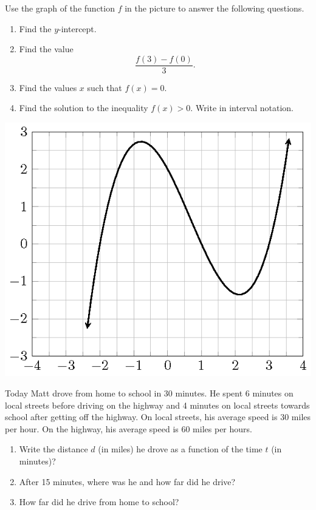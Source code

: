 \documentclass[en,12pt]{elegantbook}
\providecommand{\tightlist}{%
  \setlength{\itemsep}{0pt}\setlength{\parskip}{0pt}}
\providecommand{\tightlist}{%
  \setlength{\itemsep}{0pt}\setlength{\parskip}{0pt}}
\let\BeginKnitrBlock\begin \let\EndKnitrBlock\end
\begin{document}
\BeginKnitrBlock{exercise}
\protect\hypertarget{exr:unnamed-chunk-231}{}{\label{exr:unnamed-chunk-231} }
Use the graph of the function \(f\) in the picture to answer the following questions.

\begin{enumerate}
\def\labelenumi{\arabic{enumi}.}
\tightlist
\item
  Find the \(y\)-intercept.
\item
  Find the value
  \[\dfrac{f(3)-f(0)}{3}.\]
\item
  Find the values \(x\) such that \(f(x)=0\).
\item
  Find the solution to the inequality \(f(x)>0\). Write in interval notation.
\end{enumerate}
\EndKnitrBlock{exercise}

\begin{center}\includegraphics[width=0.5\linewidth]{figs/function-exercise-cubic} \end{center}

\BeginKnitrBlock{exercise}
\protect\hypertarget{exr:unnamed-chunk-233}{}{\label{exr:unnamed-chunk-233} }
Today Matt drove from home to school in 30 minutes. He spent 6 minutes on local streets before driving on the highway and 4 minutes on local streets towards school after getting off the highway. On local streets, his average speed is 30 miles per hour. On the highway, his average speed is 60 miles per hours.

\begin{enumerate}
\def\labelenumi{\arabic{enumi}.}
\tightlist
\item
  Write the distance \(d\) (in miles) he drove as a function of the time \(t\) (in minutes)?
\item
  After 15 minutes, where was he and how far did he drive?
\item
  How far did he drive from home to school?
\end{enumerate}
\EndKnitrBlock{exercise}
\end{document}
